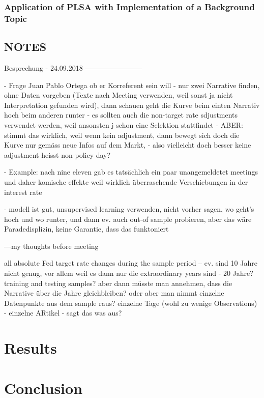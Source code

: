 \documentclass[11pt,a4paper,english,oneside]{book}
\numberwithin{equation}{chapter}
\begin{document}
\subsection{Application of PLSA with Implementation of a Background Topic}\label{Ch:implembg}




\section{NOTES}
Besprechung - 24.09.2018
------------------------

- Frage Juan Pablo Ortega ob er Korreferent sein will
- nur zwei Narrative finden, ohne Daten vorgeben (Texte nach Meeting verwenden, weil sonst ja nicht Interpretation gefunden wird), dann schauen geht die Kurve beim einten Narrativ hoch beim anderen runter
- es sollten auch die non-target rate sdjustments verwendet werden, weil ansonsten j schon eine Selektion stattfindet - ABER: stimmt das wirklich, weil wenn kein adjustment, dann bewegt sich doch die Kurve nur gemäss neue Infos auf dem Markt, - also vielleicht doch besser keine adjustment heisst non-policy day?

- Example: nach nine eleven gab es tatsächlich ein paar unangemeldetet meetings und daher komische effekte weil wirklich überraschende Verschiebungen in der interest rate

- modell ist gut, unsupervised learning verwenden, nicht vorher sagen, wo geht's hoch und wo runter, und dann ev. auch out-of sample probieren, aber das wäre Paradedisplizin, keine Garantie, dass das funktoniert

---my thoughts before meeting

all absolute Fed target rate changes during the sample period -- ev. sind 10 Jahre nicht genug, vor allem weil es dann nur die extraordinary years sind - 20 Jahre? training and testing samples? aber dann müsste man annehmen, dass die Narrative über die Jahre gleichbleiben? oder aber man nimmt einzelne Datenpunkte aus dem sample raus? einzelne Tage (wohl zu wenige Observations) - einzelne ARtikel - sagt das was aus?


\chapter{Results}

\chapter{Conclusion}
\end{document}
